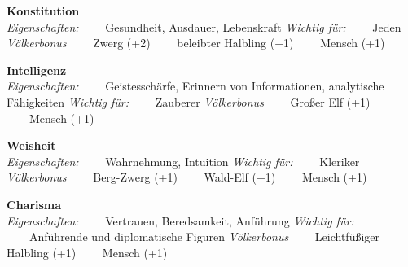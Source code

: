 \begin{dndtable}
	\textbf{Konstitution} \\
	\textit{Eigenschaften:} \newline
	\ \ \ \ Gesundheit, Ausdauer, Lebenskraft \newline
	\textit{Wichtig für:} \newline
	\ \ \ \ Jeden \newline
	\textit{Völkerbonus} \newline
	\ \ \ \ Zwerg (+2) \newline
	\ \ \ \ beleibter Halbling (+1) \newline
	\ \ \ \ Mensch (+1)
\end{dndtable}

\begin{dndtable}
	\textbf{Intelligenz} \\
	\textit{Eigenschaften:} \newline
	\ \ \ \ Geistesschärfe, Erinnern von Informationen, analytische Fähigkeiten \newline
	\textit{Wichtig für:} \newline
	\ \ \ \ Zauberer \newline
	\textit{Völkerbonus} \newline
	\ \ \ \ Großer Elf (+1) \newline
	\ \ \ \ Mensch (+1)
\end{dndtable}

\begin{dndtable}
	\textbf{Weisheit} \\
	\textit{Eigenschaften:} \newline
	\ \ \ \ Wahrnehmung, Intuition \newline
	\textit{Wichtig für:} \newline
	\ \ \ \ Kleriker \newline
	\textit{Völkerbonus} \newline
	\ \ \ \ Berg-Zwerg (+1) \newline
	\ \ \ \ Wald-Elf (+1) \newline
	\ \ \ \ Mensch (+1)
\end{dndtable}

\begin{dndtable}
	\textbf{Charisma} \\
	\textit{Eigenschaften:} \newline
	\ \ \ \ Vertrauen, Beredsamkeit, Anführung \newline
	\textit{Wichtig für:} \newline
	\ \ \ \ Anführende und diplomatische Figuren \newline
	\textit{Völkerbonus} \newline
	\ \ \ \ Leichtfüßiger Halbling (+1) \newline
	\ \ \ \ Mensch (+1)
\end{dndtable}
